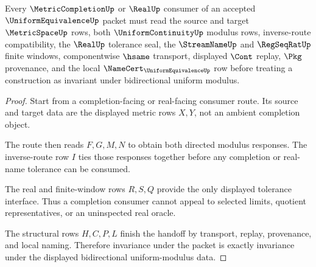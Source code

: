 \begin{theorem}
\label{thm:uniform-equivalence-completion-consumer}
Every $\MetricCompletionUp$ or $\RealUp$ consumer of an accepted $\UniformEquivalenceUp$ packet must read the source and target $\MetricSpaceUp$ rows, both $\UniformContinuityUp$ modulus rows, inverse-route compatibility, the $\RealUp$ tolerance seal, the $\StreamNameUp$ and $\RegSeqRatUp$ finite windows, componentwise $\hsame$ transport, displayed $\Cont$ replay, $\Pkg$ provenance, and the local $\NameCert_{\UniformEquivalenceUp}$ row before treating a construction as invariant under bidirectional uniform modulus.
\end{theorem}
\begin{proof}
Start from a completion-facing or real-facing consumer route. Its source and target data are the displayed metric rows $X,Y$, not an ambient completion object.

The route then reads $F,G,M,N$ to obtain both directed modulus responses. The inverse-route row $I$ ties those responses together before any completion or real-name tolerance can be consumed.

The real and finite-window rows $R,S,Q$ provide the only displayed tolerance interface. Thus a completion consumer cannot appeal to selected limits, quotient representatives, or an uninspected real oracle.

The structural rows $H,C,P,L$ finish the handoff by transport, replay, provenance, and local naming. Therefore invariance under the packet is exactly invariance under the displayed bidirectional uniform-modulus data.
\end{proof}




